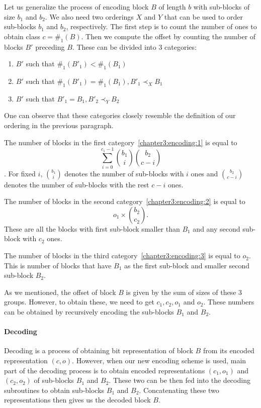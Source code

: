 Let us generalize the process of encoding block $B$ of length $b$
with sub-blocks of size $b_1$ and $b_2$. We also need two orderings $X$ and $Y$
that can be used to order sub-blocks $b_1$ and $b_2$, respectively.
The first step is to count the number of ones to obtain class $c=\#_1(B)$.
Then we compute the offset by counting the number of blocks $B'$ preceding $B$.
These can be divided into 3 categories:
\begin{enumerate}
    \item $B'$ such that $\#_1(B'_1) < \#_1(B_1)$
    \label{chapter3:encoding:1}
    \item $B'$ such that $\#_1(B'_1) = \#_1(B_1), B'_1\prec_X B_1$
    \label{chapter3:encoding:2}
    \item $B'$ such that $B'_1 = B_1, B'_2\prec_Y B_2$
    \label{chapter3:encoding:3}
\end{enumerate}
One can observe that these categories closely resemble the definition of our ordering
in the previous paragraph.

The number of blocks in the first category~\ref{chapter3:encoding:1} is equal to
$$\sum_{i=0}^{c_1-1} {b_1\choose i} {b_2\choose c-i}$$. For fixed $i$, ${b_1\choose i}$
denotes the number of sub-blocks with $i$ ones and ${b_2\choose c-i}$ denotes the number
of sub-blocks with the rest $c-i$ ones.

The number of blocks in the second category~\ref{chapter3:encoding:2} is equal to
$$o_1\times {b_2\choose c_2}.$$ These are all the blocks with first sub-block smaller
than $B_1$ and any second sub-block with $c_2$ ones.

The number of blocks in the third category~\ref{chapter3:encoding:3} is equal to $o_2$.
This is number of blocks that have $B_1$ as the first sub-block and smaller second
sub-block $B_2$.

As we mentioned, the offset of block $B$ is given by the sum of sizes of these 3 groups.
However, to obtain these, we need to get $c_1, c_2, o_1$ and $o_2$. These numbers can be
obtained by recursively encoding the sub-blocks $B_1$ and $B_2$.

\paragraph{Decoding}

Decoding is a process of obtaining bit representation of block $B$ from its encoded
representation $(c, o)$. However, when our new encoding scheme is used, main part
of the decoding process is to obtain encoded representations $(c_1, o_1)$ and
$(c_2, o_2)$ of sub-blocks $B_1$ and $B_2$. These two can be then fed into
the decoding subroutines to obtain sub-blocks $B_1$ and $B_2$. Concatenating these
two representations then gives us the decoded block $B$.

